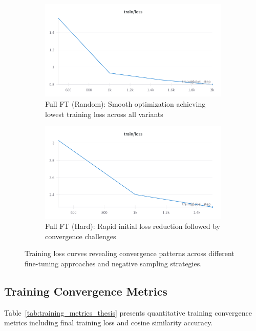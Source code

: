 \begin{figure}[t]
\begin{subfigure}{0.48\textwidth}
\includegraphics[width=\textwidth]{sbert_finetuned_1million.png}
\caption{Full FT (Random): Smooth optimization achieving lowest training loss across all variants}
\end{subfigure}
\hfill
\begin{subfigure}{0.48\textwidth}
\includegraphics[width=\textwidth]{sbert_finetuned_hard_negatives.png}
\caption{Full FT (Hard): Rapid initial loss reduction followed by convergence challenges}
\end{subfigure}
\caption{Training loss curves revealing convergence patterns across different fine-tuning approaches and negative sampling strategies.}
\label{fig:training_curves_thesis}
\end{figure}

\subsection{Training Convergence Metrics}

Table~\ref{tab:training_metrics_thesis} presents quantitative training convergence metrics including final training loss and cosine similarity accuracy.

